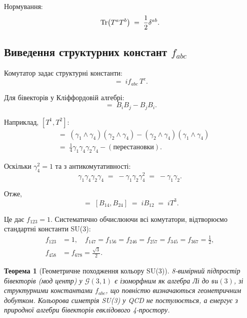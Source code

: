 \documentclass[11pt,a4paper]{article}
\newcommand{\Cl}{\mathcal{G}}
\theoremstyle{definition}
\theoremstyle{plain}
\newtheorem{theorem}{Теорема}[section]
\theoremstyle{remark}
\begin{document}
Нормування:
\begin{equation}
\Tr(T^a T^b) \;=\; \frac{1}{2}\delta^{ab}.
\end{equation}

\subsection{Виведення структурних констант $f_{abc}$}

Комутатор задає структурні константи:
\begin{equation}
[T^a,T^b] \;=\; i f_{abc}\,T^c.
\label{eq:commutator}
\end{equation}

Для бівекторів у Кліффордовій алгебрі:
\begin{equation}
[B_i,B_j] \;=\; B_i B_j - B_j B_i.
\end{equation}

Наприклад, $[T^1,T^2]$:
\begin{align}
[B_{14},B_{24}] &\;=\; (\gamma_1\wedge\gamma_4)(\gamma_2\wedge\gamma_4) - (\gamma_2\wedge\gamma_4)(\gamma_1\wedge\gamma_4) \nonumber \\
&\;=\; \frac{1}{4}\gamma_1\gamma_4\gamma_2\gamma_4 - (\text{перестановки}).
\end{align}

Оскільки $\gamma_4^2=1$ та з антикомутативності:
\begin{equation}
\gamma_1\gamma_4\gamma_2\gamma_4 \;=\; -\gamma_1\gamma_2\gamma_4^2 \;=\; -\gamma_1\gamma_2.
\end{equation}

Отже,
\begin{equation}
[T^1,T^2] \;=\; [B_{14},B_{24}] \;=\; i B_{12} \;=\; i T^3.
\end{equation}

Це дає $f_{123}=1$. Систематично обчислюючи всі комутатори, відтворюємо стандартні константи SU(3):
\begin{align}
f_{123} &= 1, \quad f_{147}=f_{156}=f_{246}=f_{257}=f_{345}=f_{367}=\frac{1}{2}, \nonumber \\
f_{458} &= f_{678} = \frac{\sqrt{3}}{2}.
\label{eq:structure-constants}
\end{align}

\begin{theorem}[Геометричне походження кольору SU(3)]
8-вимірний підпростір бівекторів (мод центр) у $\Cl(3,1)$ є ізоморфним як алгебра Лі до $\mathfrak{su}(3)$, зі структурними константами $f_{abc}$, що повністю визначаються геометричним добутком. Кольорова симетрія SU(3) у QCD не постулюється, а емергує з природної алгебри бівекторів евклідового 4-простору.
\end{theorem}
\end{document}

